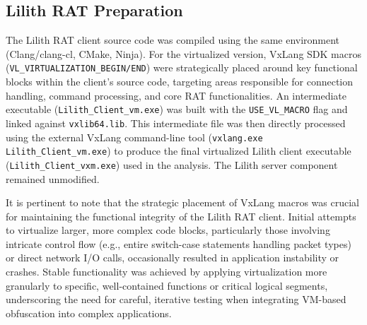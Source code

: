 \subsection{Lilith RAT Preparation}
The Lilith RAT client source code \cite{LilithRAT} was compiled using the same environment (Clang/clang-cl, CMake, Ninja). For the virtualized version, VxLang SDK macros (\texttt{VL\_VIRTUALIZATION\_BEGIN/END}) were strategically placed around key functional blocks within the client's source code, targeting areas responsible for connection handling, command processing, and core RAT functionalities. An intermediate executable (\texttt{Lilith\_Client\_vm.exe}) was built with the \texttt{USE\_VL\_MACRO} flag and linked against \texttt{vxlib64.lib}. This intermediate file was then directly processed using the external VxLang command-line tool (\texttt{vxlang.exe Lilith\_Client\_vm.exe}) to produce the final virtualized Lilith client executable (\texttt{Lilith\_Client\_vxm.exe}) used in the analysis. The Lilith server component remained unmodified.

It is pertinent to note that the strategic placement of VxLang macros was crucial for maintaining the functional integrity of the Lilith RAT client. Initial attempts to virtualize larger, more complex code blocks, particularly those involving intricate control flow (e.g., entire switch-case statements handling packet types) or direct network I/O calls, occasionally resulted in application instability or crashes. Stable functionality was achieved by applying virtualization more granularly to specific, well-contained functions or critical logical segments, underscoring the need for careful, iterative testing when integrating VM-based obfuscation into complex applications.
